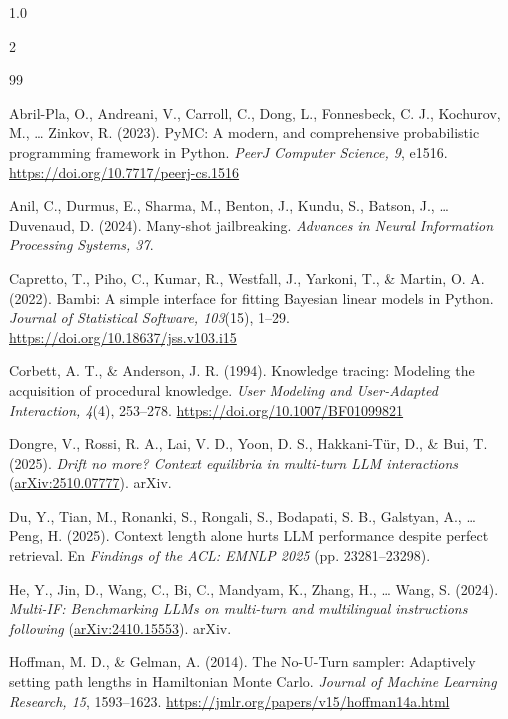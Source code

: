 \documentclass[12pt]{article}
\begin{document}
\begin{spacing}{1.0}
\scriptsize
\raggedright
\setlength{\bibsep}{0.12em}
\begin{multicols}{2}
\begin{thebibliography}{99}
\setlength{\itemsep}{0pt}
\setlength{\parsep}{0pt}

 Abril-Pla, O., Andreani, V., Carroll, C., Dong, L., Fonnesbeck, C. J., Kochurov, M., \ldots{} Zinkov, R. (2023). PyMC: A modern, and comprehensive probabilistic programming framework in Python. \emph{PeerJ Computer Science, 9}, e1516. \url{https://doi.org/10.7717/peerj-cs.1516}

 Anil, C., Durmus, E., Sharma, M., Benton, J., Kundu, S., Batson, J., \ldots{} Duvenaud, D. (2024). Many-shot jailbreaking. \emph{Advances in Neural Information Processing Systems, 37}.

 Capretto, T., Piho, C., Kumar, R., Westfall, J., Yarkoni, T., \& Martin, O. A. (2022). Bambi: A simple interface for fitting Bayesian linear models in Python. \emph{Journal of Statistical Software, 103}(15), 1--29. \url{https://doi.org/10.18637/jss.v103.i15}

 Corbett, A. T., \& Anderson, J. R. (1994). Knowledge tracing: Modeling the acquisition of procedural knowledge. \emph{User Modeling and User-Adapted Interaction, 4}(4), 253--278. \url{https://doi.org/10.1007/BF01099821}

 Dongre, V., Rossi, R. A., Lai, V. D., Yoon, D. S., Hakkani-Tür, D., \& Bui, T. (2025). \emph{Drift no more? Context equilibria in multi-turn LLM interactions} (\href{https://arxiv.org/abs/2510.07777}{arXiv:2510.07777}). arXiv.

 Du, Y., Tian, M., Ronanki, S., Rongali, S., Bodapati, S. B., Galstyan, A., \ldots{} Peng, H. (2025). Context length alone hurts LLM performance despite perfect retrieval. En \emph{Findings of the ACL: EMNLP 2025} (pp. 23281--23298).

 He, Y., Jin, D., Wang, C., Bi, C., Mandyam, K., Zhang, H., \ldots{} Wang, S. (2024). \emph{Multi-IF: Benchmarking LLMs on multi-turn and multilingual instructions following} (\href{https://arxiv.org/abs/2410.15553}{arXiv:2410.15553}). arXiv.

 Hoffman, M. D., \& Gelman, A. (2014). The No-U-Turn sampler: Adaptively setting path lengths in Hamiltonian Monte Carlo. \emph{Journal of Machine Learning Research, 15}, 1593--1623. \url{https://jmlr.org/papers/v15/hoffman14a.html}


\end{thebibliography}
\end{multicols}
\end{spacing}
\end{document}
